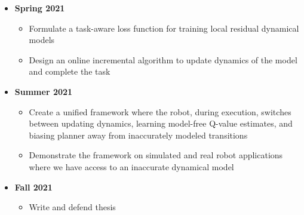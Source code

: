 \begin{itemize}
\item \textbf{Spring 2021}
  \begin{itemize}
  \item Formulate a task-aware loss function for training local residual
    dynamical models
  \item Design an online incremental algorithm to update dynamics of
    the model and complete the task
  \end{itemize}
\item \textbf{Summer 2021}
  \begin{itemize}
  \item Create a unified framework where the robot, during execution,
    switches between updating dynamics, learning model-free Q-value
    estimates, and biasing planner away from inaccurately modeled
    transitions
  \item Demonstrate the framework on simulated and real robot
    applications where we have access to an inaccurate dynamical model
  \end{itemize}
\item \textbf{Fall 2021}
  \begin{itemize}
  \item Write and defend thesis
  \end{itemize}
\end{itemize}

